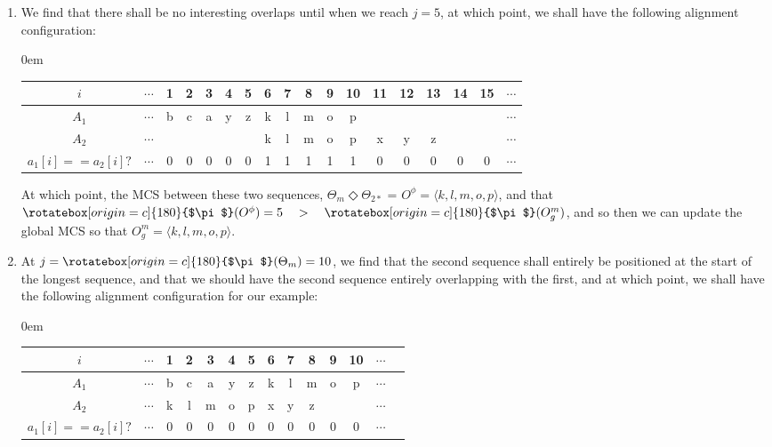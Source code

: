 \documentclass[a4paper, 18pt]{book} %
\newcommand{\invpi}{\rotatebox[origin=c]{180}{$\pi$}}
\begin{document}
\begin{enumerate}
{At which point, the MCS between these two sequences, $\Theta_m \Diamond \Theta_{2*}$ = $O^\phi = \langle \rangle$.

}
\item{ We find that there shall be no interesting overlaps until when we reach $j = 5$, at which point, we shall have the following alignment configuration:

\vspace{1em}
\begin{adjustwidth}{0em}{}
\begin{tabular}[H]{|c||c|c|c|c|c|c|c|c|c|c|c|c|c|c|c|c|c|}
\hline
$i$ & $\cdots$ & 1 & 2 & 3 & 4 & 5 & 6 & 7 & 8 & 9 & 10 & 11 & 12 & 13 & 14 & 15 & $\cdots$ \\
\hline
$A_1$ & $\cdots$ & b & c & a & y & z & k & l & m & o & p &  &  &  &  &  &$\cdots$ \\
\hline
$A_2$ & $\cdots$ &  &  &  &  &  & k & l & m & o & p & x & y & z &  &  &$\cdots$\\
\hline
$a_1[i]==a_2[i]?$ & $\cdots$ & 0 & 0 & 0 & 0 & 0 & 1 & 1 & 1 & 1 & 1 & 0 & 0 & 0 & 0 & 0 & $\cdots$ \\
\hline
 
\end{tabular}
\end{adjustwidth}
\vspace{1em}

At which point, the MCS between these two sequences, $\Theta_m \Diamond \Theta_{2*}$ = $O^\phi = \langle k, l, m, o, p\rangle$, and that $\invpi(O^\phi) = 5 \quad > \quad \invpi(O^m_g)$, and so then we can update the global MCS so that $O^m_g = \langle k, l, m, o, p\rangle$.


}
\item{ At $j =  \invpi(\Theta_m) = 10$, we find that the second sequence shall entirely be positioned at the start of the longest sequence, and that we should have the second sequence entirely overlapping with the first, and at which point, we shall have the following alignment configuration for our example:

\vspace{1em}
\begin{adjustwidth}{0em}{}
\begin{tabular}[H]{|c||c|c|c|c|c|c|c|c|c|c|c|c|c|}
\hline
$i$ & $\cdots$ & 1 & 2 & 3 & 4 & 5 & 6 & 7 & 8 & 9 & 10 & $\cdots$ \\
\hline
$A_1$ & $\cdots$ & b & c & a & y & z & k & l & m & o & p &$\cdots$ \\
\hline
$A_2$ & $\cdots$ & k & l & m & o & p & x & y & z &  &  &$\cdots$\\
\hline
$a_1[i]==a_2[i]?$ & $\cdots$ & 0 & 0 & 0 & 0 & 0 & 0 & 0 & 0 & 0 & 0  & $\cdots$ \\
\hline
 

\end{tabular}
\end{adjustwidth}}
\end{enumerate}
\end{document}
